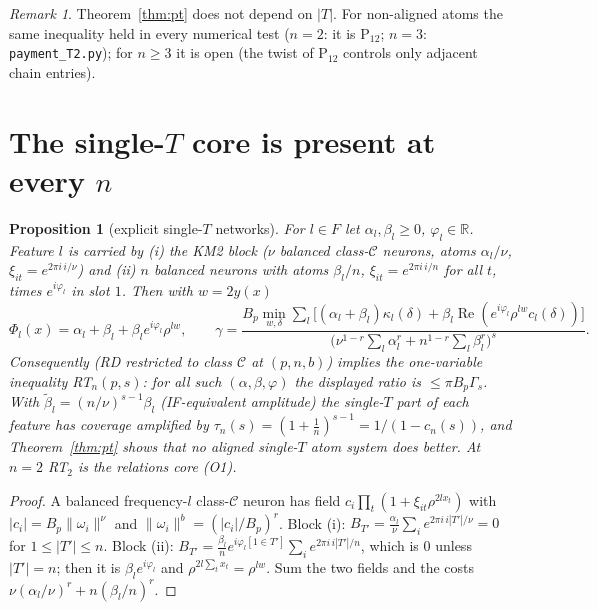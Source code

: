 \documentclass[11pt]{article}
\newtheorem{proposition}[theorem]{Proposition}
\theoremstyle{remark}
\newtheorem{remark}[theorem]{Remark}
\renewcommand{\Re}{\operatorname{Re}}
\begin{document}
\begin{remark}
Theorem~\ref{thm:pt} does not depend on $|T|$. For non-aligned atoms the same inequality held in every numerical test
($n=2$: it is P$_{12}$; $n=3$: \texttt{payment\_T2.py}); for $n\ge3$ it is open (the twist of P$_{12}$ controls only adjacent chain entries).
\end{remark}

\section{The single-$T$ core is present at every $n$}

\begin{proposition}[explicit single-$T$ networks]\label{prop:emb}
For $l\in F$ let $\alpha_l,\beta_l\ge0$, $\varphi_l\in\mathbb R$. Feature $l$ is carried by (i) the KM2 block ($\nu$ balanced class-$\mathcal C$ neurons,
atoms $\alpha_l/\nu$, $\xi_{it}=e^{2\pi i\,i/\nu}$) and (ii) $n$ balanced neurons with atoms $\beta_l/n$,
$\xi_{it}=e^{2\pi i\,i/n}$ for all $t$, times $e^{i\varphi_l}$ in slot $1$. Then with $w=2y(x)$
\[
\Phi_l(x)=\alpha_l+\beta_l+\beta_le^{i\varphi_l}\rho^{lw},\qquad
\gamma=\frac{B_p\min_{w,\delta}\sum_l\big[(\alpha_l+\beta_l)\kappa_l(\delta)+\beta_l\Re(e^{i\varphi_l}\rho^{lw}c_l(\delta))\big]}
{\big(\nu^{1-r}\sum_l\alpha_l^r+n^{1-r}\sum_l\beta_l^r\big)^s}.
\]
Consequently (RD restricted to class $\mathcal C$ at $(p,n,b)$) implies the one-variable inequality RT$_n(p,s)$: for all such
$(\alpha,\beta,\varphi)$ the displayed ratio is $\le\pi B_p\Gamma_s$. With $\tilde\beta_l=(n/\nu)^{s-1}\beta_l$ (IF-equivalent amplitude) the
single-$T$ part of each feature has coverage amplified by $\tau_n(s)=(1+\frac1n)^{s-1}=1/(1-c_n(s))$, and Theorem~\ref{thm:pt}
shows that no aligned single-$T$ atom system does better. At $n=2$ RT$_2$ is the relations core (O1).
\end{proposition}
\begin{proof}
A balanced frequency-$l$ class-$\mathcal C$ neuron has field $c_i\prod_t(1+\xi_{it}\rho^{2lx_t})$ with $|c_i|=B_p\|\omega_i\|^\nu$ and
$\|\omega_i\|^b=(|c_i|/B_p)^r$. Block (i): $B_{T'}=\frac{\alpha_l}\nu\sum_i e^{2\pi i\,i|T'|/\nu}=0$ for $1\le|T'|\le n$.
Block (ii): $B_{T'}=\frac{\beta_l}ne^{i\varphi_l[1\in T']}\sum_ie^{2\pi i\,i|T'|/n}$, which is $0$ unless $|T'|=n$; then it is $\beta_le^{i\varphi_l}$
and $\rho^{2l\sum_tx_t}=\rho^{lw}$. Sum the two fields and the costs $\nu(\alpha_l/\nu)^r+n(\beta_l/n)^r$.
\end{proof}
\end{document}
